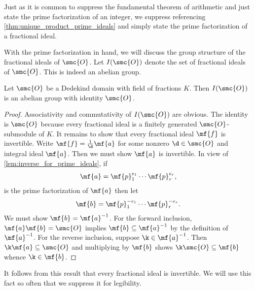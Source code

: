 \documentclass[12pt]{article}
\begin{document}
      Just as it is common to suppress the fundamental theorem of arithmetic and just state the prime factorization of an integer, we suppress referencing \cref{thm:unique_product_prime_ideals} and simply state the prime factorization of a fractional ideal.

      With the prime factorization in hand, we will discuss the group structure of the fractional ideals of \(\smc{O}\). Let \(I(\smc{O})\) denote the set of fractional ideals of \(\smc{O}\). This is indeed an abelian group.

      \begin{theorem}\label{thm:ideal_group_is_a_group}
        Let \(\smc{O}\) be a Dedekind domain with field of fractions \(K\). Then \(I(\smc{O})\) is an abelian group with identity \(\smc{O}\).
      \end{theorem}
      \begin{proof}
        Associativity and commutativity of \(I(\smc{O})\) are obvious. The identity is \(\smc{O}\) because every fractional ideal is a finitely generated \(\smc{O}\)-submodule of \(K\). It remains to show that every fractional ideal \(\mf{f}\) is invertible. Write \(\mf{f} = \frac{1}{\d}\mf{a}\) for some nonzero \(\d \in \smc{O}\) and integral ideal \(\mf{a}\). Then we must show \(\mf{a}\) is invertible. In view of \cref{lem:inverse_for_prime_ideals}, if
        \[
          \mf{a} = \mf{p}_{1}^{e_{1}} \cdots \mf{p}_{r}^{e_{r}},
        \]
        is the prime factorization of \(\mf{a}\) then let
        \[
          \mf{b} = \mf{p}_{1}^{-e_{1}} \cdots \mf{p}_{r}^{-e_{r}}.
        \]
        We must show \(\mf{b} = \mf{a}^{-1}\). For the forward inclusion, \(\mf{a}\mf{b} = \smc{O}\) implies \(\mf{b} \subseteq \mf{a}^{-1}\) by the definition of \(\mf{a}^{-1}\). For the reverse inclusion, suppose \(\k \in \mf{a}^{-1}\). Then \(\k\mf{a} \subseteq \smc{O}\) and multiplying by \(\mf{b}\) shows \(\k\smc{O} \subseteq \mf{b}\) whence \(\k \in \mf{b}\).
      \end{proof}

      It follows from this result that every fractional ideal is invertible. We will use this fact so often that we suppress it for legibility. 
      
\end{document}

